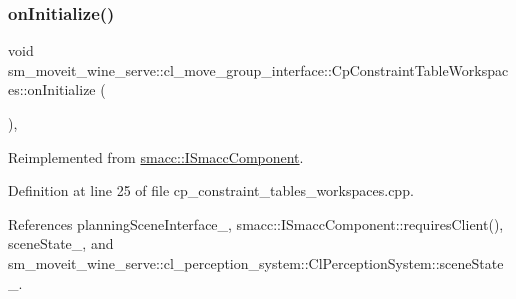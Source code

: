 \subsubsection{\texorpdfstring{on\+Initialize()}{onInitialize()}}
{\footnotesize\ttfamily void sm\+\_\+moveit\+\_\+wine\+\_\+serve\+::cl\+\_\+move\+\_\+group\+\_\+interface\+::\+Cp\+Constraint\+Table\+Workspaces\+::on\+Initialize (\begin{DoxyParamCaption}{ }\end{DoxyParamCaption})\hspace{0.3cm}{\ttfamily [override]}, {\ttfamily [virtual]}}



Reimplemented from \hyperlink{classsmacc_1_1ISmaccComponent_ae6f71d008db12553912e9436184b9e65}{smacc\+::\+I\+Smacc\+Component}.



Definition at line 25 of file cp\+\_\+constraint\+\_\+tables\+\_\+workspaces.\+cpp.



References planning\+Scene\+Interface\+\_\+, smacc\+::\+I\+Smacc\+Component\+::requires\+Client(), scene\+State\+\_\+, and sm\+\_\+moveit\+\_\+wine\+\_\+serve\+::cl\+\_\+perception\+\_\+system\+::\+Cl\+Perception\+System\+::scene\+State\+\_\+.



